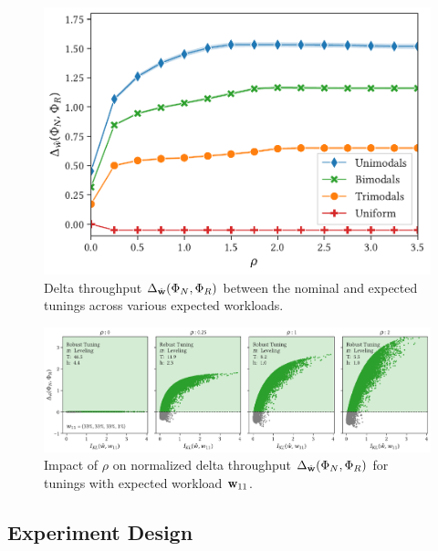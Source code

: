 \begin{figure}
    \centering
    \includegraphics[scale=0.5]{figures/delta_throughput_workload_type.pdf}
    \caption{Delta throughput $\Delta_{{{\hat{\bf{w}}}}}(\Phi_{N}, \Phi_{R})$
        between the nominal and expected tunings across various expected workloads.
    }
    \label{fig:delta_throughput_workload_type}
\end{figure}


\begin{figure}[ht]
    \centering
    \includegraphics[width=\textwidth]{figures/scatterplot_evolution_rho.pdf}
    \caption{Impact of $\rho$ on normalized delta throughput 
        $\Delta_{{{\hat{\bf{w}}}}}(\Phi_{N}, \Phi_{R})$ for tunings with expected
        workload ${{\bf{w}}}_{11}$.
    }
    \label{fig:scatterplot_evolution_rho}
\end{figure}


\subsection{Experiment Design}

